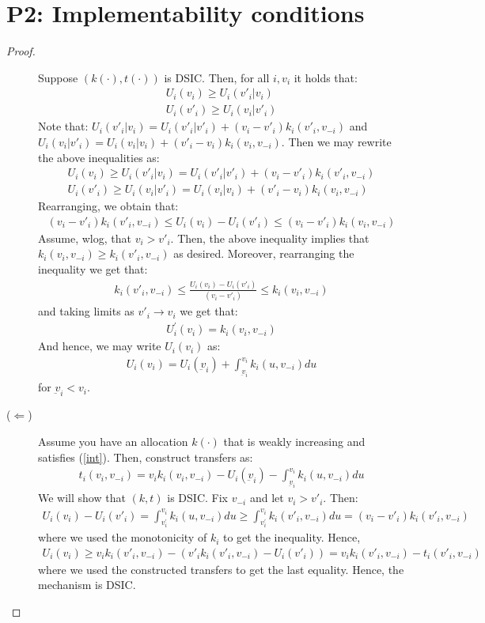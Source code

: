 \documentclass{article}
\newcommand{\enterProblemHeader}[1]{
\nobreak\extramarks{#1}{#1 continued on next page\ldots}\nobreak
\nobreak\extramarks{#1 (continued)}{#1 continued on next page\ldots}\nobreak
}
\newcommand{\exitProblemHeader}[1]{
\nobreak\extramarks{#1 (continued)}{#1 continued on next page\ldots}\nobreak
\nobreak\extramarks{#1}{}\nobreak
}
\newcounter{homeworkProblemCounter} %
\newcommand{\homeworkProblemName}{}
\newenvironment{ex}[1][Problem \arabic{homeworkProblemCounter}]{ %
\stepcounter{homeworkProblemCounter} %
\renewcommand{\homeworkProblemName}{#1} %
\section{\homeworkProblemName} %
}{
}
\begin{document}
\begin{ex}[P2: Implementability conditions]
\begin{proof}
\begin{description}
			Suppose $(k(\cdot),t(\cdot))$ is DSIC. Then, for all $i,v_i$ it holds that:
			\begin{align*}
			U_i(v_i)\geq U_i(v'_i|v_i)\\
			U_i(v'_i)\geq U_i(v_i|v'_i)
			\end{align*}
			Note that: $U_i(v'_i|v_i)=U_i(v'_i|v'_i)+(v_i-v'_i)k_i(v'_i,v_{-i})$ and $U_i(v_i|v'_i)=U_i(v_{i}|v_{i})+(v'_i-v_i)k_i(v_i,v_{-i})$. Then we may rewrite the above inequalities as:
			\begin{align*}
			U_i(v_i)\geq U_i(v'_i|v_i)=U_i(v'_i|v'_i)+(v_i-v'_i)k_i(v'_i,v_{-i})\\
			U_i(v'_i)\geq U_i(v_i|v'_i)=U_i(v_{i}|v_{i})+(v'_i-v_i)k_i(v_i,v_{-i})
			\end{align*}
			Rearranging, we obtain that:
			\begin{align*}
			(v_i-v'_i)k_i(v'_i,v_{-i})\leq U_i(v_i)-U_{i}(v'_i)\leq (v_i-v'_i)k_i(v_i,v_{-i})
			\end{align*}
			Assume, wlog, that $v_i>v'_i$. Then, the above inequality implies that $k_i(v_i,v_{-i})\geq k_i(v'_i,v_{-i})$ as desired. Moreover, rearranging the inequality we get that:
			\begin{align*}
			k_i(v'_i,v_{-i})\leq \frac{U_i(v_i)-U_{i}(v'_i)}{(v_i-v'_i)}\leq k_i(v_i,v_{-i})
			\end{align*}
			and taking limits as $v'_i\rightarrow v_i$ we get that:
			\begin{align*}
			U_i^{'}(v_i)= k_i(v_i,v_{-i})
			\end{align*}
			And hence, we may write $U_i(v_i)$ as:
			\begin{align*}
			U_{i}(v_i)=U_i(\underbar{v}_{i})+\int_{\underbar{v}_{i}}^{v_i}k_{i}(u,v_{-i})du
			\end{align*}
			for $\underbar{v}_i<v_i$.
			
			\item [($\Leftarrow$)] Assume you have an allocation $k(\cdot)$ that is weakly increasing and satisfies (\ref{int}). Then, construct transfers as:
			\begin{align*}
			t_i(v_i,v_{-i})=v_ik_i(v_i,v_{-i})-U_i(\underbar{v}_{i})-\int_{\underbar{v}_{i}}^{v_i}k_{i}(u,v_{-i})du
			\end{align*}
			We will show that $(k,t)$ is DSIC. Fix $v_{-i}$ and let $v_i>v'_i$. Then:
			\begin{align*}
			U_i(v_i)-U_{i}(v'_i)= \int_{v^{'}_{i}}^{v_i}k_{i}(u,v_{-i})du\geq \int_{v^{'}_{i}}^{v_i}k_{i}(v'_i,v_{-i})du=(v_i-v'_i)k_i(v'_i,v_{-i})
			\end{align*}
			where we used the monotonicity of $k_i$ to get the inequality. Hence,
			\begin{align*}
			U_i(v_i)\geq v_ik_i(v'_i,v_{-i})-(v'_ik_i(v'_i,v_{-i})-U_i(v'_i))=v_ik_i(v'_i,v_{-i})-t_i(v'_i,v_{-i})
			\end{align*}
			where we used the constructed transfers to get the last equality. Hence, the mechanism is DSIC.
		\end{description}
	\end{proof}
	\fi
\end{ex}
\end{document}
